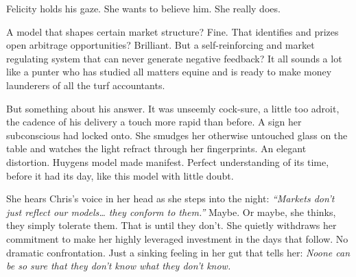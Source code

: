 \smallskip

Felicity holds his gaze. She wants to believe him. She really does.

\smallskip

A model that shapes certain market structure? Fine. That identifies and prizes open arbitrage opportunities? Brilliant. But a self-reinforcing and market regulating system that can never generate negative feedback? It all sounds a lot like a punter who has studied all matters equine and is ready to make money launderers of all the turf accountants. 

\smallskip

But something about his answer. It was unseemly cock-sure, a little too adroit, the cadence of his delivery a touch more rapid than before. A sign her subconscious had locked onto. She smudges her otherwise untouched glass on the table and watches the light refract through her fingerprints. An elegant distortion. Huygens model made manifest. Perfect understanding of its time, before it had its day, like this model with little doubt.

\smallskip

She hears Chris’s voice in her head as she steps into the night: \textit{“Markets don’t just reflect our models… they conform to them.”} Maybe.  Or maybe, she thinks, they simply tolerate them. That is until they don’t. She quietly withdraws her commitment to make her highly leveraged investment in the days that follow. No dramatic confrontation. Just a sinking feeling in her gut that tells her:
\textit{Noone can be so sure that they don’t know what they don’t know.}


\newpage 

